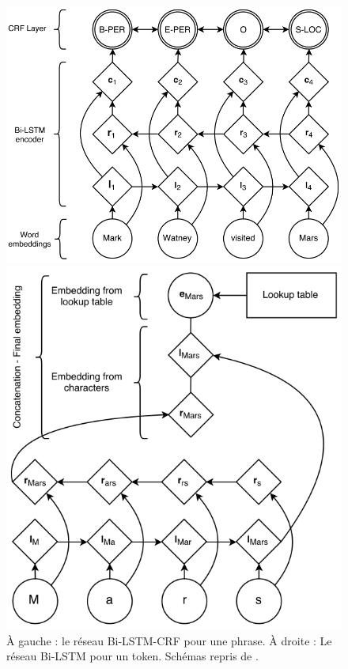 \documentclass[12pt,a4paper,times,twoside,openright]{report}
\begin{document}
\begin{figure}[ht!]
\begin{minipage}{0.49\linewidth}
    \centering
    \includegraphics[scale=0.35]{images/LSTM/LSTM-CRF}
\end{minipage}
\begin{minipage}{0.49\linewidth}
    \centering
    \includegraphics[scale=0.4]{images/LSTM/LSTM-char}
\end{minipage}
\caption{À gauche : le réseau Bi-LSTM-CRF pour une phrase. À droite : Le réseau Bi-LSTM pour un token. Schémas repris de \citet{lample2016neural}.}
\label{fig:lstm-CRF}
\end{figure}
\end{document}
